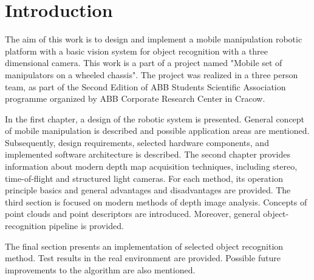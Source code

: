 \chapter*{Introduction}
\label{cha:introduction}




The aim of this work is to design and implement a mobile manipulation robotic platform with a basic vision system for object recognition with a three dimensional camera. This work is a part of a project named "Mobile set of manipulators on a wheeled chassis". The project was realized in a three person team, as part of the Second Edition of ABB Students Scientific Association programme organized by ABB Corporate Research Center in Cracow.

	In the first chapter, a design of the robotic system is presented. General concept of mobile manipulation is described and possible application areas are mentioned. Subsequently, design requirements, selected hardware components, and implemented software architecture is described. The second chapter provides information about modern depth map acquisition techniques, including stereo, time-of-flight and structured light cameras. For each method, its operation principle basics and general advantages and disadvantages are provided. The third section is focused on modern methods of depth image analysis. Concepts of point clouds and point descriptors are introduced. Moreover, general object-recognition pipeline is provided.
	
	The final section presents an implementation of selected object recognition method. Test results in the real environment are provided. Possible future improvements to the algorithm are also mentioned.
	
\begin{comment}

Tematem pracy jest opis wybranych elementów składowych projektu o nazwie: Mobilny zespół manipulatorów na wspólnej platformie jezdnej. Projekt ten zrealizowany został w ramach Drugiej Edycji Koła Naukowego ABB we współpracy z Korporacyjnym Centrum Badawczym ABB w Krakowie. Zespół projektowy składał się z trzech osób pomiędzy które zostały podzielone zadania. Na tej podstawie zrealizowane zostały trzy prace dyplomowe inżynierskie. Niniejsza, związana z projektem mechanicznym, samodzielnym montażem wszystkich podzespołów oraz z analizą zagadnień kinematycznych zespołu dwóch skonstruowanych manipulatorów oraz dwie inne prace związane z oprogramowaniem operatorskim oraz z systemem akwizycji i przetwarzania danych. Projekt był realizowany w okresie od marca do listopada 2014 roku i jego główną częścią było uruchomienie zbudowanego urządzenia i jego prezentacja podczas uroczystego podsumowania.

\end{comment}









